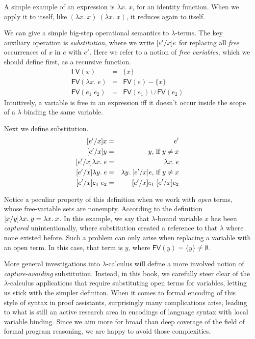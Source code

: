 \documentclass{amsbook}
\theoremstyle{definition}
\theoremstyle{remark}
\numberwithin{section}{chapter}
\numberwithin{equation}{chapter}
\begin{document}
A simple example of an expression is $\lambda x. \; x$, for an identity function.
When we apply it to itself, like $(\lambda x. \; x) \; (\lambda x. \; x)$, it reduces again to itself.

\newcommand{\fv}[1]{\textsf{FV}(#1)}

We can give a simple big-step operational semantics to $\lambda$-terms.
The key auxiliary operation is \emph{substitution}, where we write $\subst{e}{x}{e'}$ for replacing all \emph{free} occurrences of $x$ in $e$ with $e'$.
Here we refer to a notion of \emph{free variables}, which we should define first, as a recursive function.
\begin{eqnarray*}
  \fv{x} &=& \{x\} \\
  \fv{\lambda x. \; e} &=& \fv{e} - \{x\} \\
  \fv{e_1 \; e_2} &=& \fv{e_1} \cup \fv{e_2}
\end{eqnarray*}
Intuitively, a variable is free in an expression iff it doesn't occur inside the scope of a $\lambda$ binding the same variable.

Next we define substitution.
\begin{eqnarray*}
  \subst{x}{x}{e'} &=& e' \\
  \subst{y}{x}{e'} &=& y\textrm{, if $y \neq x$} \\
  \subst{\lambda x. \; e}{x}{e'} &=& \lambda x. \; e \\
  \subst{\lambda y. \; e}{x}{e'} &=& \lambda y. \; \subst{e}{x}{e'}\textrm{, if $y \neq x$} \\
  \subst{e_1 \; e_2}{x}{e'} &=& \subst{e_1}{x}{e'} \; \subst{e_2}{x}{e'}
\end{eqnarray*}

Notice a peculiar property of this definition when we work with \emph{open} terms, whose free-variable sets are nonempty.
According to the definition $\subst{\lambda x. \; y}{y}{x} = \lambda x. \; x$.
In this example, we say that $\lambda$-bound variable $x$ has been \emph{captured} unintentionally, where substitution created a reference to that $\lambda$ where none existed before.
Such a problem can only arise when replacing a variable with an open term.
In this case, that term is $y$, where $\fv{y} = \{y\} \neq \emptyset$.

More general investigations into $\lambda$-calculus will define a more involved notion of \emph{capture-avoiding} substitution.
Instead, in this book, we carefully steer clear of the $\lambda$-calculus applications that require substituting open terms for variables, letting us stick with the simpler definiton.
When it comes to formal encoding of this style of syntax in proof assistants, surprisingly many complications arise, leading to what is still an active research area in encodings of language syntax with local variable binding.
Since we aim more for broad than deep coverage of the field of formal program reasoning, we are happy to avoid those complexities.
\end{document}
